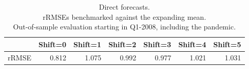 \documentclass[11pt,a4paper]{article}
\begin{document}
\begin{table}[ht]
\caption{Direct forecasts.\\
rRMSEs benchmarked against the expanding mean.\\Out-of-sample evaluation starting in Q1-2008, including the pandemic.} 
\label{tab:rRMSE_mSSA_direct_mean4}
\centering
\begin{tabular}{rrrrrrr}
  \hline
 & Shift=0 & Shift=1 & Shift=2 & Shift=3 & Shift=4 & Shift=5 \\ 
  \hline
rRMSE & 0.812 & 1.075 & 0.992 & 0.977 & 1.021 & 1.031 \\ 
   \hline
\end{tabular}

\end{table}
\end{document}
